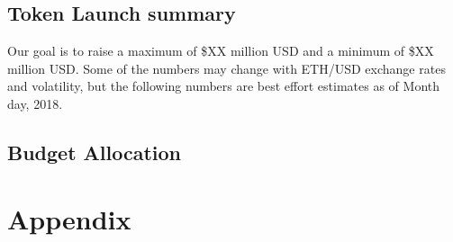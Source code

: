 \documentclass[11pt]{article}
\begin{document}
\subsection{Token Launch summary}
\label{sec-6-1}
{Our goal is to raise a maximum of \$XX million USD and a minimum of \$XX million USD. Some of the numbers may change with ETH/USD exchange rates and volatility, but the following numbers are best effort estimates as of Month day, 2018. }%

\subsection{Budget Allocation}
\label{sec-6-4}



\section{Appendix}
\label{sec-8}



\printbibliography

\vspace*{\fill}

\begin{flushright}

\pdfcreationdate
\end{flushright}
\end{document}
